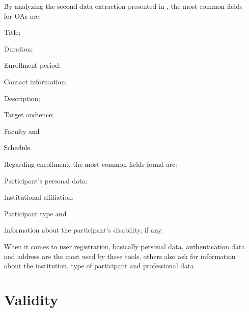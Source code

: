 \begin{itemize}
        By analyzing the second data extraction presented in , the most common fields for \acp{OA} are:
        \begin{inparaenum}[(a)]
          \item Title;
          \item Duration;
          \item Enrollment period;
          \item Contact information;
          \item Description;
          \item Target audience;
          \item Faculty and
          \item Schedule.
        \end{inparaenum}

        Regarding enrollment, the most common fields found are:
        \begin{inparaenum}[(a)]
          \item Participant's personal data;
          \item Institutional affiliation;
          \item Participant type and
          \item Information about the participant's disability, if any.
        \end{inparaenum}

        When it comes to user registration, basically personal data, authentication data and address are the most used by these tools, others also ask for information about the institution, type of participant and professional data.
\end{itemize}

\section{Validity}\label{sec:gl-validity}

